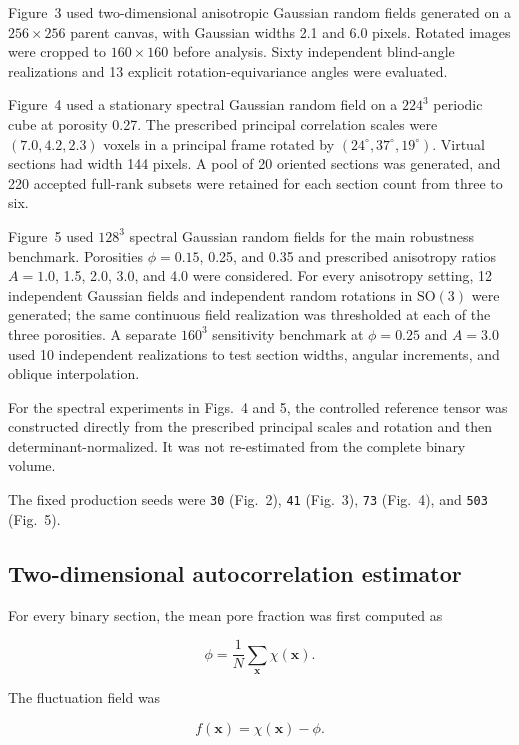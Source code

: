 \documentclass{article}
\begin{document}
Figure~3 used two-dimensional anisotropic Gaussian random fields generated on
a $256\times256$ parent canvas, with Gaussian widths 2.1 and 6.0 pixels.
Rotated images were cropped to $160\times160$ before analysis. Sixty
independent blind-angle realizations and 13 explicit rotation-equivariance
angles were evaluated.

Figure~4 used a stationary spectral Gaussian random field on a $224^3$
periodic cube at porosity 0.27. The prescribed principal correlation scales
were $(7.0,4.2,2.3)$ voxels in a principal frame rotated by
$(24^{\circ},37^{\circ},19^{\circ})$. Virtual sections had width 144 pixels.
A pool of 20 oriented sections was generated, and 220 accepted full-rank
subsets were retained for each section count from three to six.

Figure~5 used $128^3$ spectral Gaussian random fields for the main robustness
benchmark. Porosities $\phi=0.15$, 0.25, and 0.35 and prescribed anisotropy
ratios $A=1.0$, 1.5, 2.0, 3.0, and 4.0 were considered. For every anisotropy
setting, 12 independent Gaussian fields and independent random rotations in
$\mathrm{SO}(3)$ were generated; the same continuous field realization was
thresholded at each of the three porosities. A separate $160^3$ sensitivity
benchmark at $\phi=0.25$ and $A=3.0$ used 10 independent realizations to test
section widths, angular increments, and oblique interpolation.

For the spectral experiments in Figs.~4 and 5, the controlled reference tensor
was constructed directly from the prescribed principal scales and rotation and
then determinant-normalized. It was not re-estimated from the complete binary
volume.

The fixed production seeds were
\texttt{30} (Fig.~2), \texttt{41} (Fig.~3), \texttt{73} (Fig.~4), and
\texttt{503} (Fig.~5).

\subsection{Two-dimensional autocorrelation estimator}
\label{sec:SI_acf2d}

For every binary section, the mean pore fraction was first computed as

\begin{equation}
    \phi =
    \frac{1}{N}
    \sum_{\mathbf{x}}\chi(\mathbf{x}).
\end{equation}

The fluctuation field was

\begin{equation}
    f(\mathbf{x})=\chi(\mathbf{x})-\phi.
\end{equation}
\end{document}
